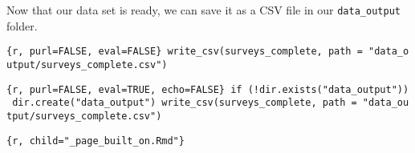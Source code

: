 \documentclass[]{article}
\begin{document}
Now that our data set is ready, we can save it as a CSV file in our
\texttt{data\_output} folder.

\texttt{\{r,\ purl=FALSE,\ eval=FALSE\}\ write\_csv(surveys\_complete,\ path\ =\ "data\_output/surveys\_complete.csv")}

\texttt{\{r,\ purl=FALSE,\ eval=TRUE,\ echo=FALSE\}\ if\ (!dir.exists("data\_output"))\ dir.create("data\_output")\ write\_csv(surveys\_complete,\ path\ =\ "data\_output/surveys\_complete.csv")}

\texttt{\{r,\ child="\_page\_built\_on.Rmd"\}}
\end{document}
